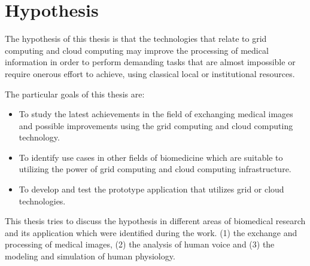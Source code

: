 \chapter{Hypothesis}

The hypothesis of this thesis is that the technologies that relate to grid computing and cloud computing may improve the processing of medical information in order to perform demanding tasks that are almost impossible or require onerous effort to achieve, using classical local or institutional resources.

The particular goals of this thesis are:
\begin{itemize}
\item To study the latest achievements in the field of exchanging medical images and  possible improvements using the grid computing and cloud computing technology.
\item To identify use cases in other fields of biomedicine which are suitable to utilizing the power of grid computing and cloud computing infrastructure.
\item To develop and test the prototype application that utilizes grid or cloud technologies.
\end{itemize}

This thesis tries to discuss the hypothesis in different areas of biomedical research and its application which were identified during the work. (1) the exchange and processing of medical images, (2) the analysis of human voice and (3) the modeling and simulation of human physiology.

